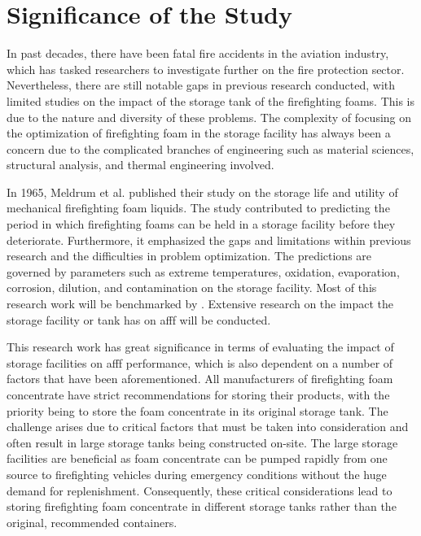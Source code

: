 \section{Significance of the Study}
In past decades, there have been fatal fire accidents in the aviation industry, which has tasked researchers to investigate further on the fire protection sector. Nevertheless, there are still notable gaps in previous research conducted, with limited studies on the impact of the storage tank of the firefighting foams. This is due to the nature and diversity of these problems. The complexity of focusing on the optimization of firefighting foam in the storage facility has always been a concern due to the complicated branches of engineering such as material sciences, structural analysis, and thermal engineering involved. 

In 1965, Meldrum et al. \cite{meldrum1965storage} published their study on the storage life and utility of mechanical firefighting foam liquids. The study contributed to predicting the period in which firefighting foams can be held in a storage facility before they deteriorate. Furthermore, it emphasized the gaps and limitations within previous research and the difficulties in problem optimization. The predictions are governed by parameters such as extreme temperatures, oxidation, evaporation, corrosion, dilution, and contamination on the storage facility. Most of this research work will be benchmarked by \cite{meldrum1965storage}. Extensive research on the impact the storage facility or tank has on \acrshort{afff} will be conducted.

This research work has great significance in terms of evaluating the impact of storage facilities on \acrshort{afff} performance, which is also dependent on a number of factors that have been aforementioned. All manufacturers of firefighting foam concentrate have strict recommendations for storing their products, with the priority being to store the foam concentrate in its original storage tank. The challenge arises due to critical factors that must be taken into consideration and often result in large storage tanks being constructed on-site. The large storage facilities are beneficial as foam concentrate can be pumped rapidly from one source to firefighting vehicles during emergency conditions without the huge demand for replenishment. Consequently, these critical considerations lead to storing firefighting foam concentrate in different storage tanks rather than the original, recommended containers.

